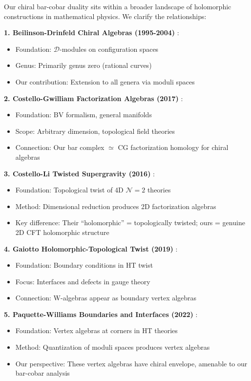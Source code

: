 \begin{remark}\label{rem:holomorphic-landscape}
Our chiral bar-cobar duality sits within a broader landscape of holomorphic 
constructions in mathematical physics. We clarify the relationships:

\textbf{1. Beilinson-Drinfeld Chiral Algebras (1995-2004)} \cite{BD04}:
\begin{itemize}
\item Foundation: $\mathcal{D}$-modules on configuration spaces
\item Genus: Primarily genus zero (rational curves)
\item Our contribution: Extension to all genera via moduli spaces
\end{itemize}

\textbf{2. Costello-Gwilliam Factorization Algebras (2017)} \cite{CG17}:
\begin{itemize}
\item Foundation: BV formalism, general manifolds
\item Scope: Arbitrary dimension, topological field theories
\item Connection: Our bar complex $\simeq$ CG factorization homology for chiral algebras
\end{itemize}

\textbf{3. Costello-Li Twisted Supergravity (2016)} \cite{CL16}:
\begin{itemize}
\item Foundation: Topological twist of 4D $\mathcal{N}=2$ theories
\item Method: Dimensional reduction produces 2D factorization algebras
\item Key difference: Their ``holomorphic'' = topologically twisted; 
      ours = genuine 2D CFT holomorphic structure
\end{itemize}

\textbf{4. Gaiotto Holomorphic-Topological Twist (2019)} \cite{Gai19}:
\begin{itemize}
\item Foundation: Boundary conditions in HT twist
\item Focus: Interfaces and defects in gauge theory
\item Connection: W-algebras appear as boundary vertex algebras
\end{itemize}

\textbf{5. Paquette-Williams Boundaries and Interfaces (2022)} \cite{PW22}:
\begin{itemize}
\item Foundation: Vertex algebras at corners in HT theories
\item Method: Quantization of moduli spaces produces vertex algebras
\item Our perspective: These vertex algebras have chiral envelope, 
      amenable to our bar-cobar analysis
\end{itemize}


\end{remark}
